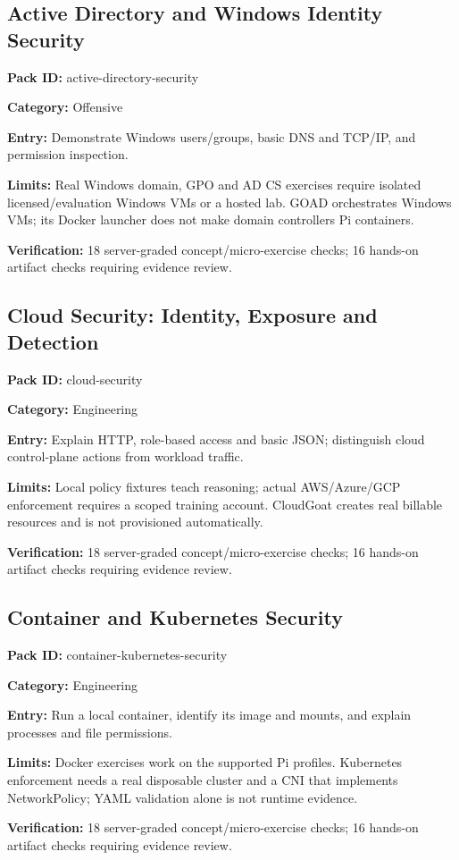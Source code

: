 \subsection{Active Directory and Windows Identity Security}
\noindent\textbf{Pack ID:} active-directory-security\par
\noindent\textbf{Category:} Offensive\par
\noindent\textbf{Entry:} Demonstrate Windows users/groups, basic DNS and TCP/IP, and permission inspection.\par
\noindent\textbf{Limits:} Real Windows domain, GPO and AD CS exercises require isolated licensed/evaluation Windows VMs or a hosted lab. GOAD orchestrates Windows VMs; its Docker launcher does not make domain controllers Pi containers.\par
\noindent\textbf{Verification:} 18 server-graded concept/micro-exercise checks; 16 hands-on artifact checks requiring evidence review.\par
\subsection{Cloud Security: Identity, Exposure and Detection}
\noindent\textbf{Pack ID:} cloud-security\par
\noindent\textbf{Category:} Engineering\par
\noindent\textbf{Entry:} Explain HTTP, role-based access and basic JSON; distinguish cloud control-plane actions from workload traffic.\par
\noindent\textbf{Limits:} Local policy fixtures teach reasoning; actual AWS/Azure/GCP enforcement requires a scoped training account. CloudGoat creates real billable resources and is not provisioned automatically.\par
\noindent\textbf{Verification:} 18 server-graded concept/micro-exercise checks; 16 hands-on artifact checks requiring evidence review.\par
\subsection{Container and Kubernetes Security}
\noindent\textbf{Pack ID:} container-kubernetes-security\par
\noindent\textbf{Category:} Engineering\par
\noindent\textbf{Entry:} Run a local container, identify its image and mounts, and explain processes and file permissions.\par
\noindent\textbf{Limits:} Docker exercises work on the supported Pi profiles. Kubernetes enforcement needs a real disposable cluster and a CNI that implements NetworkPolicy; YAML validation alone is not runtime evidence.\par
\noindent\textbf{Verification:} 18 server-graded concept/micro-exercise checks; 16 hands-on artifact checks requiring evidence review.\par
